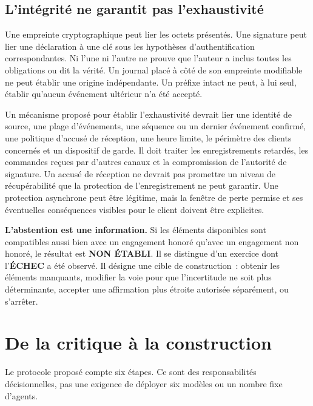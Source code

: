 \documentclass[11pt,a4paper]{article}
\newcommand{\status}[1]{\textsf{\textbf{#1}}}
\begin{document}
\subsection{L’intégrité ne garantit pas l’exhaustivité}
Une empreinte cryptographique peut lier les octets présentés. Une signature peut lier une déclaration à une clé sous les hypothèses d’authentification correspondantes. Ni l’une ni l’autre ne prouve que l’auteur a inclus toutes les obligations ou dit la vérité. Un journal placé à côté de son empreinte modifiable ne peut établir une origine indépendante. Un préfixe intact ne peut, à lui seul, établir qu’aucun événement ultérieur n’a été accepté.

Un mécanisme proposé pour établir l’exhaustivité devrait lier une identité de source, une plage d’événements, une séquence ou un dernier événement confirmé, une politique d’accusé de réception, une heure limite, le périmètre des clients concernés et un dispositif de garde. Il doit traiter les enregistrements retardés, les commandes reçues par d’autres canaux et la compromission de l’autorité de signature. Un accusé de réception ne devrait pas promettre un niveau de récupérabilité que la protection de l’enregistrement ne peut garantir. Une protection asynchrone peut être légitime, mais la fenêtre de perte permise et ses éventuelles conséquences visibles pour le client doivent être explicites.

\begin{scopebox}
\textbf{L’abstention est une information.} Si les éléments disponibles sont compatibles aussi bien avec un engagement honoré qu’avec un engagement non honoré, le résultat est \status{NON ÉTABLI}. Il se distingue d’un exercice dont l’\status{ÉCHEC} a été observé. Il désigne une cible de construction~: obtenir les éléments manquants, modifier la voie pour que l’incertitude ne soit plus déterminante, accepter une affirmation plus étroite autorisée séparément, ou s’arrêter.
\end{scopebox}

\section{De la critique à la construction}\label{sec:protocol}
Le protocole proposé compte six étapes. Ce sont des responsabilités décisionnelles, pas une exigence de déployer six modèles ou un nombre fixe d’agents.
\end{document}

